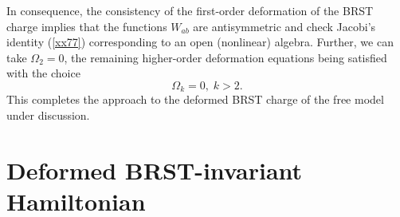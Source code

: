 \documentclass[a4paper,12pt]{article}
\begin{document}
In consequence, the consistency of the first-order deformation of the BRST
charge implies that the functions $W_{ab}$ are antisymmetric and check
Jacobi's identity (\ref{xx77}) corresponding to an open (nonlinear) algebra.
Further, we can take $\Omega _{2}=0$, the remaining higher-order deformation
equations being satisfied with the choice 
\begin{equation}
\Omega _{k}=0,\;k>2.  \label{xx78}
\end{equation}
This completes the approach to the deformed BRST charge of the free model
under discussion.

\section{Deformed BRST-invariant Hamiltonian}
\end{document}
